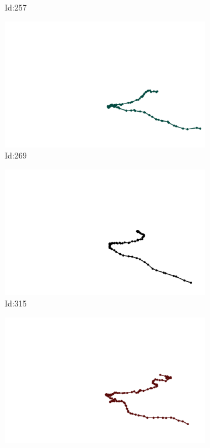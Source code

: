 \documentclass[12pt,twoside]{report}
\begin{document}
\begin{figure}
\begin{subfigure}[b]{0.20\textwidth}
\caption{Id:257}
\end{subfigure}
\begin{subfigure}[b]{0.20\textwidth}
\centering
\includegraphics[width=\textwidth]{../trajectories/269.png}
\caption{Id:269}
\end{subfigure}
\begin{subfigure}[b]{0.20\textwidth}
\centering
\includegraphics[width=\textwidth]{../trajectories/315.png}
\caption{Id:315}
\end{subfigure}
\begin{subfigure}[b]{0.20\textwidth}
\centering
\includegraphics[width=\textwidth]{../trajectories/348.png}

\end{subfigure}
\end{figure}
\end{document}
